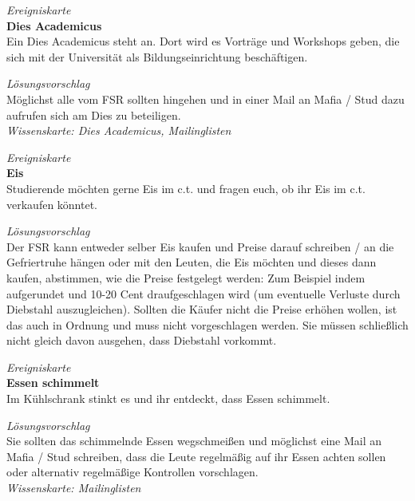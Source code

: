 \documentclass[a4paper,11pt]{scrartcl} %
\begin{document}
\begin{framed}
\textit{Ereigniskarte} \\

\textbf{Dies Academicus} \\
Ein Dies Academicus steht an. Dort wird es Vorträge und Workshops 
geben, die sich mit der Universität als Bildungseinrichtung beschäftigen.
\end{framed}

\begin{framed}
\textit{Lösungsvorschlag} \\

Möglichst alle vom FSR sollten hingehen und in einer Mail an 
Mafia / Stud dazu aufrufen sich am Dies zu beteiligen.\\

\textit{Wissenskarte: Dies Academicus, Mailinglisten}
\end{framed}

\begin{framed}
\textit{Ereigniskarte} \\

\textbf{Eis} \\
Studierende möchten gerne Eis im c.t. und fragen euch, ob ihr Eis im c.t. verkaufen könntet.
\end{framed}

\begin{framed}
\textit{Lösungsvorschlag} \\

Der FSR kann entweder selber Eis kaufen und Preise darauf schreiben / an die 
Gefriertruhe hängen oder mit den Leuten, die Eis möchten und dieses dann kaufen, 
abstimmen, wie die Preise festgelegt werden: Zum Beispiel indem aufgerundet 
und 10-20 Cent draufgeschlagen wird (um eventuelle Verluste durch Diebstahl 
auszugleichen). Sollten die Käufer nicht die Preise erhöhen wollen, ist 
das auch in Ordnung und muss nicht vorgeschlagen werden. Sie müssen 
schließlich nicht gleich davon ausgehen, dass Diebstahl vorkommt. 

\end{framed}


\begin{framed}
\textit{Ereigniskarte} \\

\textbf{Essen schimmelt} \\ 
Im Kühlschrank stinkt es und ihr entdeckt, dass Essen schimmelt.
\end{framed}

\begin{framed}
\textit{Lösungsvorschlag} \\

Sie sollten das schimmelnde Essen wegschmeißen und möglichst eine 
Mail an Mafia / Stud schreiben, dass die Leute regelmäßig 
auf ihr Essen achten sollen oder alternativ regelmäßige Kontrollen vorschlagen.  \\

\textit{Wissenskarte: Mailinglisten}
\end{framed}
\end{document}
